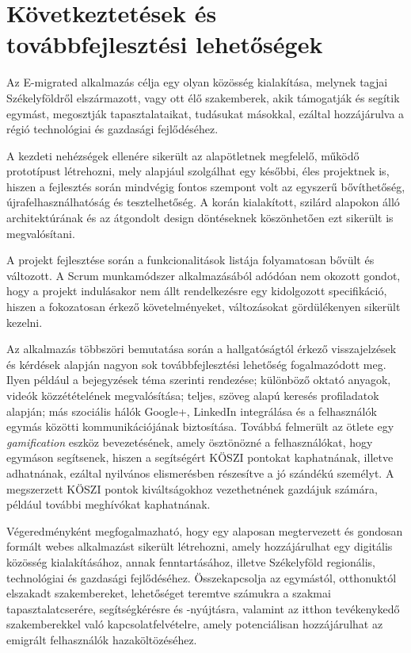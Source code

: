 \chapter{Következtetések és továbbfejlesztési lehetőségek}
\label{ch:kovetkeztetes}

Az E-migrated alkalmazás célja egy olyan közösség kialakítása, melynek tagjai Székelyföldről elszármazott, vagy ott élő szakemberek, akik támogatják és segítik egymást, megosztják tapasztalataikat, tudásukat másokkal, ezáltal hozzájárulva a régió technológiai és gazdasági fejlődéséhez. 

A kezdeti nehézségek ellenére sikerült az alapötletnek megfelelő, működő prototípust létrehozni, mely alapjául szolgálhat egy későbbi, éles projektnek is, hiszen a fejlesztés során mindvégig fontos szempont volt az egyszerű bővíthetőség, újrafelhasználhatóság és tesztelhetőség.  A korán kialakított, szilárd alapokon álló architektúrának és az átgondolt design döntéseknek köszönhetően ezt sikerült is megvalósítani. 

A projekt fejlesztése során a funkcionalitások listája folyamatosan bővült és változott. A Scrum munkamódszer alkalmazásából adódóan nem okozott gondot, hogy a projekt indulásakor nem állt rendelkezésre egy kidolgozott specifikáció, hiszen a fokozatosan érkező követelményeket, változásokat gördülékenyen sikerült kezelni. 

Az alkalmazás többszöri bemutatása során a hallgatóságtól érkező visszajelzések és kérdések alapján nagyon sok továbbfejlesztési lehetőség fogalmazódott meg. Ilyen például a bejegyzések téma szerinti rendezése; különböző oktató anyagok, videók közzétételének megvalósítása; teljes, szöveg alapú keresés profiladatok alapján; más szociális hálók Google+, LinkedIn integrálása és a felhasználók egymás közötti kommunikációjának biztosítása. Továbbá felmerült az ötlete egy \textit{gamification} eszköz bevezetésének, amely ösztönözné a felhasználókat, hogy egymáson segítsenek, hiszen a segítségért KÖSZI pontokat kaphatnának, illetve adhatnának, ezáltal nyilvános elismerésben részesítve a jó szándékú személyt. A megszerzett KÖSZI pontok kiváltságokhoz vezethetnének gazdájuk számára, például további meghívókat kaphatnának. 

Végeredményként megfogalmazható, hogy egy alaposan megtervezett és gondosan formált webes alkalmazást sikerült létrehozni, amely hozzájárulhat egy digitális közösség kialakításához, annak fenntartásához, illetve Székelyföld regionális, technológiai és gazdasági fejlődéséhez. Összekapcsolja az egymástól, otthonuktól elszakadt szakembereket, lehetőséget teremtve számukra a szakmai tapasztalatcserére, segítségkérésre és -nyújtásra, valamint az itthon tevékenykedő szakemberekkel való kapcsolatfelvételre, amely potenciálisan hozzájárulhat az emigrált felhasználók hazaköltözéséhez. 
